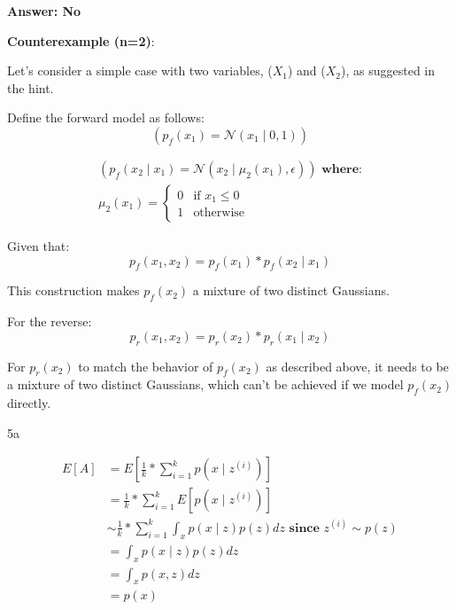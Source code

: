 \begin{answer}
    \textbf{Answer: No}
    
    \textbf{Counterexample (n=2)}:
    
    Let's consider a simple case with two variables, (\(X_1\)) and (\(X_2\)), as suggested in the hint.
    
    Define the forward model as follows:
    \begin{equation}
        (p_f(x_1) = \mathcal{N}(x_1 \mid 0, 1))
    \end{equation}

    \begin{equation}
    \begin{split}
        (p_f(x_2 \mid x_1) = \mathcal{N}(x_2 \mid \mu_2(x_1), \epsilon)) \textbf{ where:} \\
        \mu_2(x_1) = \begin{cases} 
                   0 & \text{if } x_1 \le 0 \\
                   1 & \text{otherwise}
               \end{cases}
    \end{split}
    \end{equation}

    Given that:
    \begin{equation}
        p_f(x_1, x_2) = p_f(x_1) * p_f(x_2 \mid x_1)
    \end{equation}

    This construction makes \(p_f(x_2)\) a mixture of two distinct Gaussians.

    For the reverse:
    \begin{equation}
        p_r(x_1, x_2) = p_r(x_2) * p_r(x_1 \mid x_2)
    \end{equation}

    For \(p_r(x_2)\) to match the behavior of \(p_f(x_2)\) as described above, it needs to be a mixture of two distinct Gaussians, which can't be achieved if we model \(p_f(x_2)\) directly.
\end{answer}

\clearpage

\LARGE
5a
\normalsize

\begin{answer}
    \begin{equation}
    \begin{split}
        E[A] & = E[\frac{1}{k} * \sum_{i=1}^{k} p(x \mid z^{(i)})] \\
             & = \frac{1}{k} * \sum_{i=1}^{k}E[p(x \mid z^{(i)})] \\
             & \sim \frac{1}{k} * \sum_{i=1}^{k} \int_x p(x \mid z)p(z)dz \textbf{ since } z^{(i)} \sim p(z)\\
             & = \int_x p(x \mid z)p(z) dz \\
             & = \int_x p(x, z) dz \\
             & = p(x)
    \end{split}
    \end{equation}
\end{answer}

